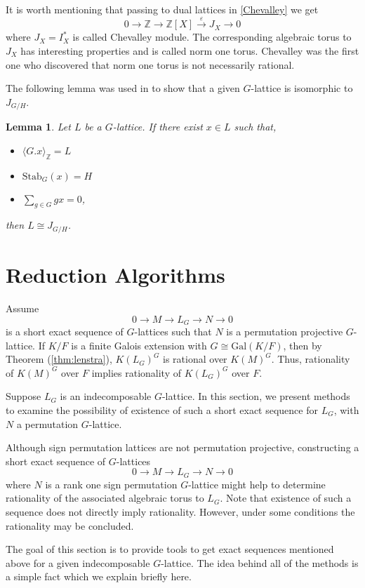 \documentclass[12pt]{article}
\theoremstyle{plain}
\newtheorem{lemma}[theorem]{Lemma}
\theoremstyle{definition}
\newcommand{\Z}{\ensuremath{\mathbb{Z}}}
\begin{document}
It is worth mentioning that passing to dual lattices in \ref{Chevalley} we get 
$$0 \longrightarrow \Z \longrightarrow \Z [X] \overset{\varepsilon} \longrightarrow  J_{X} \longrightarrow 0$$
where $J_{X}= I^{\ast}_X$ is called Chevalley module. The corresponding algebraic 
torus to $J_X$ has interesting properties and is called norm one torus. Chevalley 
was the first one who discovered that norm one torus is not necessarily rational. 

The following lemma was used in \cite{Nicole1} to show that a given $G$-lattice 
is isomorphic to $J_{G/H}$.
\begin{lemma}\cite[Remark 4.1]{Nicole1}
Let $L$ be a $G$-lattice. If there exist $x\in L$ such that,
\begin{itemize}
\item $\langle G.x \rangle_{\Z} = L$
\item $\mathrm{Stab}_G(x) = H$
\item $\sum_{g \in G}gx = 0$,
\end{itemize}
then $L \cong J_{G/H}$.
\end{lemma}

\section{Reduction Algorithms}\label{sec:redalg}
Assume $$0 \rightarrow M  \rightarrow L_G \rightarrow N \rightarrow 0$$ is a short 
exact sequence of $G$-lattices such that $N$ is a permutation projective $G$-lattice. 
If $K/F$ is a finite Galois extension with $G \cong \mathrm{Gal}(K/F)$, then by 
Theorem (\ref{thm:lenstra}), $K(L_G)^G$ is rational over $K(M)^G$. Thus, rationality 
of $K(M)^G$ over $F$ implies rationality of $K(L_G)^G$ over $F$.

Suppose $L_G$ is an indecomposable $G$-lattice. In this section, we present methods 
to examine the possibility of existence of such a short exact sequence for $L_G$, with
 $N$ a permutation $G$-lattice.
 
Although sign permutation lattices are not permutation projective, constructing a 
short exact sequence of $G$-lattices $$0 \rightarrow M  \rightarrow L_G \rightarrow N \rightarrow 0$$ 
where $N$ is a rank one sign permutation $G$-lattice might help to determine 
rationality of the associated algebraic torus to $L_G$. Note that existence of 
such a sequence does not directly imply rationality. However, under some conditions 
the rationality may be concluded. 

The goal of this section is to provide tools to get exact sequences mentioned above 
for a given indecomposable $G$-lattice. The idea behind all of the methods is a simple 
fact which we explain briefly here. 
\end{document}

